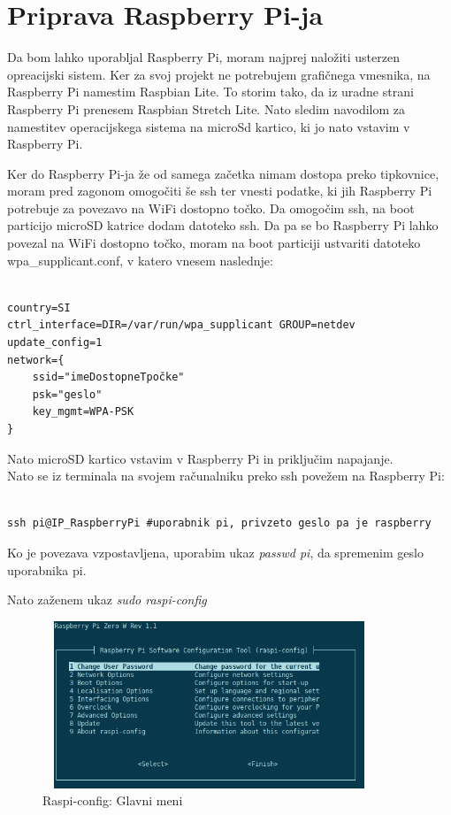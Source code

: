 \documentclass[11pt]{article}
\begin{document}
\section{Priprava Raspberry Pi-ja}
 Da bom lahko uporabljal Raspberry Pi, moram najprej naložiti usterzen opreacijski sistem. Ker za svoj projekt ne potrebujem grafičnega vmesnika, na Raspberry Pi namestim Raspbian Lite. To storim tako, da iz uradne strani Raspberry Pi \cite{RPi_raspbian} prenesem Raspbian Stretch Lite. Nato sledim navodilom za namestitev \cite{RPi_install} operacijskega sistema na microSd kartico, ki jo nato vstavim v Raspberry Pi.

Ker do Raspberry Pi-ja že od samega začetka nimam dostopa preko tipkovnice, moram pred zagonom omogočiti še \gls{ssh} ter vnesti podatke, ki jih Raspberry Pi potrebuje za povezavo na WiFi dostopno točko. Da omogočim \gls{ssh}, na boot particijo microSD katrice dodam datoteko ssh. Da pa se bo Raspberry Pi lahko povezal na WiFi dostopno točko, moram na boot particiji ustvariti datoteko wpa\_supplicant.conf, v katero vnesem naslednje:
\newpage
\begin{verbatim}

country=SI
ctrl_interface=DIR=/var/run/wpa_supplicant GROUP=netdev
update_config=1
network={
	ssid="imeDostopneTpočke"
	psk="geslo"
	key_mgmt=WPA-PSK
}
\end{verbatim}

Nato microSD kartico vstavim v Raspberry Pi in priključim napajanje.
\\

Nato se iz terminala na svojem računalniku preko \gls{ssh} povežem na Raspberry Pi:

\begin{verbatim}

ssh pi@IP_RaspberryPi #uporabnik pi, privzeto geslo pa je raspberry
\end{verbatim}

Ko je povezava vzpostavljena, uporabim ukaz \textit{passwd pi}, da spremenim geslo uporabnika pi.

Nato zaženem ukaz \textit{sudo raspi-config}
\begin{figure}[h]
\centering
\includegraphics[width=10cm, height=5cm]{images/raspi-config.png}
\caption{Raspi-config: Glavni meni}
\end{figure}
\end{document}
